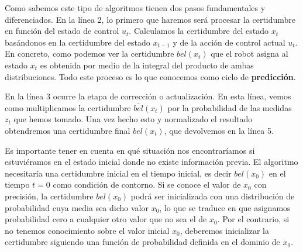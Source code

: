 Como sabemos este tipo de algoritmos tienen dos pasos fundamentales y diferenciados.
En la línea 2, lo primero que haremos será procesar la certidumbre en función del estado de control $u_{t}$. 
Calculamos la certidumbre del estado $x_{t}$ basándonos en la certidumbre del estado $x_{t-1}$ y de la acción de control actual $u_{t}$.
En concreto, como podemos ver la certidumbre $\bar{bel}(x_{t})$ que el robot asigna al estado $x_{t}$ es obtenida por medio de la integral del producto de ambas distribuciones.
Todo este proceso es lo que conocemos como ciclo de \textbf{predicción}.

En la línea 3 ocurre la etapa de \textrm{corrección o actualización}.
%
%
%
En esta línea, vemos como multiplicamos la certidumbre $\bar{bel}(x_{t})$ por la probabilidad de las medidas $z_{t}$ que hemos tomado. Una vez hecho esto y normalizado el resultado obtendremos una certidumbre final $bel(x_{t})$, que devolvemos en la línea 5.

Es importante tener en cuenta en qué situación nos encontraríamos si estuviéramos en el estado inicial donde no existe información previa. 
El algoritmo necesitaría una certidumbre inicial en el tiempo inicial, es decir $bel(x_{0})$ en el tiempo $t=0$ como condición de contorno.
Si se conoce el valor de $x_{0}$ con precisión, la certidumbre $bel(x_{0})$ podrá ser inicializada con una distribución de probabilidad cuya media sea dicho valor $x_{0}$, lo que se traduce en que asignamos probabilidad cero a cualquier otro valor que no sea el de $x_{0}$. 
%
%
%
Por el contrario, si no tenemos conocimiento sobre el valor inicial $x_{0}$, deberemos inicializar la certidumbre siguiendo una función de probabilidad definida en el dominio de $x_{0}$.

